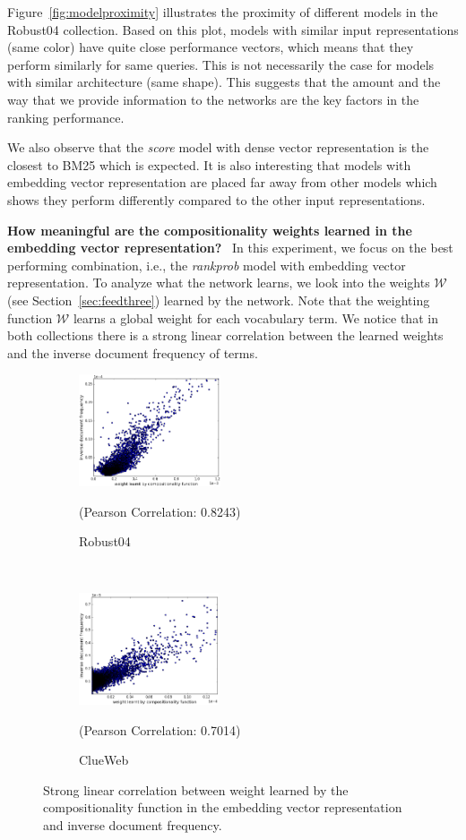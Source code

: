 \documentclass[sigconf]{acmart}
\newcommand{\modelone}{\textit{score} model\xspace}
\newcommand{\modelthree}{\textit{rank\-prob} model\xspace}
\newcommand{\feedone}{dense vector representation\xspace}
\newcommand{\feedthree}{embedding vector representation\xspace}
\newcommand{\mypar}[1]{\vspace*{-0.1ex}\medskip\noindent\textbf{#1}~}
\begin{document}
Figure~\ref{fig:modelproximity} illustrates the proximity of different models in the Robust04 collection. Based on this plot, models with similar input representations (same color) have quite close performance vectors, which means that they perform similarly for same queries. This is not necessarily the case for models with similar architecture (same shape). 
This suggests that the amount and the way that we provide information to the networks are the key factors in the ranking performance. 

We also observe that the \modelone with \feedone is the closest to BM25 which is expected. 
It is also interesting that models with \feedthree are placed far away from other models which shows they perform differently compared to the other input representations.


\mypar{How meaningful are the compositionality weights learned in the \feedthree?}
%
In this experiment, we focus on the best performing combination, i.e., the \modelthree with \feedthree. To analyze what the network learns, we look into the weights $\mathcal{W}$ (see Section~\ref{sec:feedthree}) learned by the network. Note that the weighting function $\mathcal{W}$ learns a global weight for each vocabulary term. We notice that in both collections there is a strong linear correlation between the learned weights and the inverse document frequency of terms. 

%
\begin{figure}[!t]%
    \centering
    \begin{subfigure}[t]{0.24\textwidth}
        \centering
        \includegraphics[height=3.3cm]{Images/scatter_r}
        \caption{\label{fig:scatter_r}Robust04}{\scriptsize{(Pearson Correlation: 0.8243)}\vspace*{-3ex}}
    \end{subfigure}%
    ~
    \begin{subfigure}[t]{0.24\textwidth}
        \centering
        \includegraphics[height=3.3cm]{Images/scatter_c}
        \caption{\label{fig:scatter_c}ClueWeb}{\scriptsize{(Pearson Correlation: 0.7014)}\vspace*{-3ex}}
    \end{subfigure}%
    \caption{\label{fig:scatter}Strong linear correlation between weight learned by the compositionality function in the \feedthree and inverse document frequency.}
    \vspace{-10pt}
\end{figure}
\end{document}
